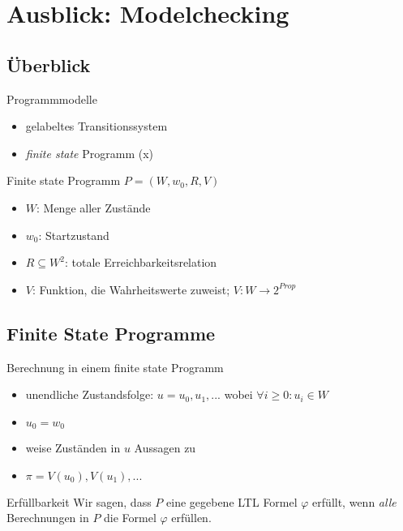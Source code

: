 \section{Ausblick: Modelchecking}

\subsection{Überblick}
\begin{frame}{\insertsubsection}
    \begin{block}{Programmmodelle}
        \begin{itemize}
            \item gelabeltes Transitionssystem
            \item \textit{finite state} Programm (x)
        \end{itemize}
    \end{block}
    \pause
    \begin{block}{Finite state Programm}
    $P = (W, w_0, R, V)$
        \begin{itemize}
            \item $W$: Menge aller Zustände
            \item $w_0$: Startzustand
            \item $R \subseteq W^2$: totale Erreichbarkeitsrelation
            \item $V$: Funktion, die Wahrheitswerte zuweist; $V: W \rightarrow 2^{Prop}$
        \end{itemize}
    \end{block}
\end{frame}

\subsection{Finite State Programme}
\begin{frame}{\insertsubsection}
    \begin{block}{Berechnung in einem finite state Programm \cite{vardi+96}}
    \begin{itemize}
        \item unendliche Zustandsfolge: $u = u_0, u_1, ... $ wobei $\forall i \geq 0: u_i \in W$
        \item $u_0 = w_0$
        \item weise Zuständen in $u$ Aussagen zu
        \item $\pi = V(u_0), V(u_1), ...$
    \end{itemize}
    \pause
    \end{block}
    \begin{block}{Erfüllbarkeit}
        Wir sagen, dass $P$ eine gegebene LTL Formel $\varphi$ erfüllt, wenn \textit{alle} Berechnungen in $P$ die Formel $\varphi$ erfüllen.
    \end{block}
\end{frame}

